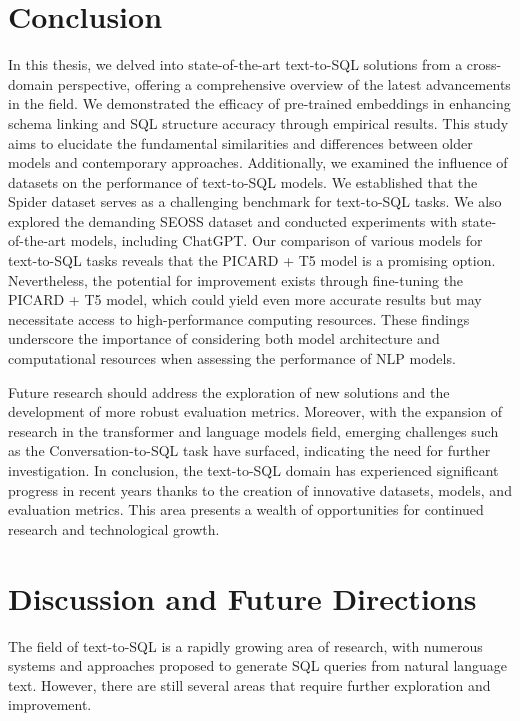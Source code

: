 \section{Conclusion}

In this thesis, we delved into state-of-the-art text-to-SQL solutions from a cross-domain perspective, offering a comprehensive overview of the latest advancements in the field. We demonstrated the efficacy of pre-trained embeddings in enhancing schema linking and SQL structure accuracy through empirical results. This study aims to elucidate the fundamental similarities and differences between older models and contemporary approaches.
Additionally, we examined the influence of datasets on the performance of text-to-SQL models. We established that the Spider dataset serves as a challenging benchmark for text-to-SQL tasks. We also explored the demanding SEOSS dataset and conducted experiments with state-of-the-art models, including ChatGPT. Our comparison of various models for text-to-SQL tasks reveals that the PICARD + T5 model is a promising option. Nevertheless, the potential for improvement exists through fine-tuning the PICARD + T5 model, which could yield even more accurate results but may necessitate access to high-performance computing resources. These findings underscore the importance of considering both model architecture and computational resources when assessing the performance of NLP models.

Future research should address the exploration of new solutions and the development of more robust evaluation metrics. Moreover, with the expansion of research in the transformer and language models field, emerging challenges such as the Conversation-to-SQL task have surfaced, indicating the need for further investigation.
In conclusion, the text-to-SQL domain has experienced significant progress in recent years thanks to the creation of innovative datasets, models, and evaluation metrics. This area presents a wealth of opportunities for continued research and technological growth.

\clearpage

\section{Discussion and Future Directions}

The field of text-to-SQL is a rapidly growing area of research, with numerous systems and approaches proposed to generate SQL queries from natural language text. However, there are still several areas that require further exploration and improvement.

